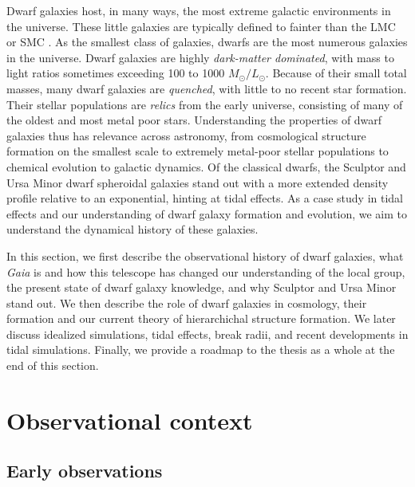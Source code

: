 Dwarf galaxies host, in many ways, the most extreme galactic
environments in the universe. These little galaxies are typically
defined to fainter than the LMC or SMC \citep[\(M_V \gtrsim -18\),
e.g.][\citet{hodge1971}]{mcconnachie2012}. As the smallest class of
galaxies, dwarfs are the most numerous galaxies in the universe. Dwarf
galaxies are highly \emph{dark-matter dominated}, with mass to light
ratios sometimes exceeding 100 to 1000 \(M_\odot/ L_\odot\). Because of
their small total masses, many dwarf galaxies are \emph{quenched}, with
little to no recent star formation. Their stellar populations are
\emph{relics} from the early universe, consisting of many of the oldest
and most metal poor stars. Understanding the properties of dwarf
galaxies thus has relevance across astronomy, from cosmological
structure formation on the smallest scale to extremely metal-poor
stellar populations to chemical evolution to galactic dynamics. Of the
classical dwarfs, the Sculptor and Ursa Minor dwarf spheroidal galaxies
stand out with a more extended density profile relative to an
exponential, hinting at tidal effects. As a case study in tidal effects
and our understanding of dwarf galaxy formation and evolution, we aim to
understand the dynamical history of these galaxies.

In this section, we first describe the observational history of dwarf
galaxies, what \emph{Gaia} is and how this telescope has changed our
understanding of the local group, the present state of dwarf galaxy
knowledge, and why Sculptor and Ursa Minor stand out. We then describe
the role of dwarf galaxies in cosmology, their formation and our current
theory of hierarchichal structure formation. We later discuss idealized
simulations, tidal effects, break radii, and recent developments in
tidal simulations. Finally, we provide a roadmap to the thesis as a
whole at the end of this section.

\section{Observational context}\label{observational-context}

\subsection{Early observations}\label{early-observations}

